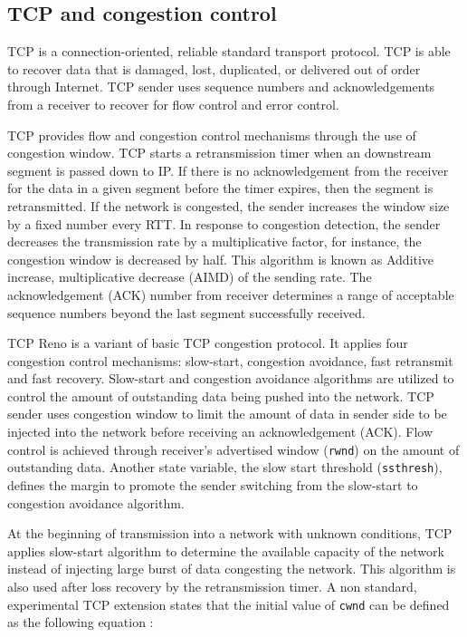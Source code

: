 \documentclass[conference,a4paper]{../../sty/IEEEtran}
\begin{document}
\subsection{TCP and congestion control}

TCP \cite{tcp} is a connection-oriented, reliable standard transport protocol. TCP is able to recover data that is damaged, lost, duplicated, or delivered out of order through Internet. TCP sender uses sequence numbers and acknowledgements from a receiver to recover for flow control and error control.

TCP provides flow and congestion control mechanisms through the use of congestion window. TCP starts a retransmission timer when an downstream segment is passed down to IP. If there is no acknowledgement from the receiver for the data in a given segment before the timer expires, then the segment is retransmitted. If the network is congested, the sender increases the window size by a fixed number every RTT. In response to congestion detection, the sender decreases the transmission rate by a multiplicative factor, for instance, the congestion window is decreased by half. This algorithm is known as Additive increase, multiplicative decrease (AIMD) of the sending rate. The acknowledgement (ACK) number from receiver determines a range of acceptable sequence numbers beyond the last segment successfully received. 


TCP Reno is a variant of basic TCP congestion protocol. It applies four congestion control mechanisms: slow-start, congestion avoidance, fast retransmit and fast recovery. Slow-start and congestion avoidance algorithms are utilized to control the amount of outstanding data being pushed into the network. TCP sender uses congestion window to limit the amount of data in sender side to be injected into the network before receiving an acknowledgement (ACK). Flow control is achieved through receiver's advertised window (\texttt{rwnd}) on the amount of outstanding data. Another state variable, the slow start threshold (\texttt{ssthresh}), defines the margin to promote the sender switching from the slow-start to congestion avoidance algorithm.

At the beginning of transmission into a network with unknown conditions, TCP applies slow-start algorithm to determine the available capacity of the network instead of injecting large burst of data congesting the network. This algorithm is also used after loss recovery by the retransmission timer. A non standard, experimental TCP extension states that the initial value of \texttt{cwnd} can be defined as the following equation \cite{RFC2414}:
\end{document}
